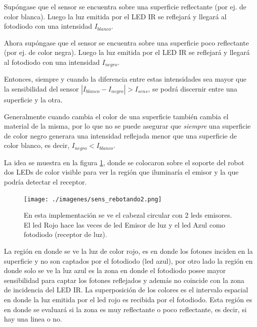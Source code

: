 \documentclass[10pt,conference,a4paper,onecolumn]{article}%
\begin{document}
Supóngase que el sensor se encuentra sobre una superficie reflectante (por ej. de color blanca).
 Luego la luz emitida por el LED IR se reflejará y llegará al fotodiodo con una intensidad $I_{blanco}$.
 
Ahora supóngase que el sensor se encuentra sobre una superficie poco reflectante (por ej. de color negra). Luego la luz emitida por el LED IR se reflejará y llegará al fotodiodo con una intensidad $I_{negro}$.

Entonces, siempre y cuando la diferencia entre estas intensidades sea mayor que la sensibilidad del sensor  $|I_{blanco} - I_{negro} |> I_{sens}$, se podrá discernir entre una superficie y la otra.

Generalmente cuando cambia el color de una superficie también cambia el material de la misma, por lo que no se puede asegurar que \textit{siempre} una superficie de color negro generara una intensidad reflejada menor que una superficie de color blanco, es decir, $I_{negro} <I_{blanco}$. 

La idea se muestra en la figura \ref{fig:sensorLinea}, donde se colocaron sobre el soporte del robot dos LEDs de color visible para ver la región que iluminaría el emisor y la que podría detectar el receptor.
 
\begin{figure}[h]
\centering
\texttt{[image: ./imagenes/sens\_rebotando2.png]}%
\caption{En esta implementación se ve el cabezal circular con 2 leds emisores. El led Rojo hace las veces de led Emisor de luz y el led Azul como fotodiodo (receptor de luz).}
\label{fig:sensorLinea}
\end{figure}
La región en donde se ve la luz de color rojo, es en donde los fotones inciden en la superficie y no son captados por el fotodiodo (led azul), por otro lado la región en donde solo se ve la luz azul es la zona en donde el fotodiodo posee mayor sensibilidad para captar los fotones reflejados y además no coincide con la zona de incidencia del LED IR. La superposición de los colores es el intervalo espacial en donde la luz emitida por el led rojo es recibida por el fotodiodo. Esta región es en donde se evaluará si la zona es muy reflectante o poco reflectante, es decir, si hay una linea o no.
\end{document}
